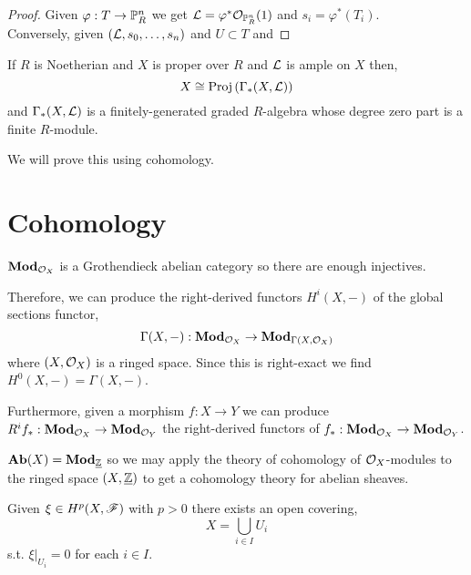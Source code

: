 \documentclass[12pt]{article}
\begin{document}
\begin{proof}
Given $\varphi : T \to \P^n_R$ we get $\L = \varphi^* \struct{\P^n_R}(1)$ and $s_i  = \varphi^*(T_i)$. 
\bigskip\\
Conversely, given $(\L, s_0, \dots, s_n)$ and $U \subset T$ and 
\end{proof}

\begin{theorem}
If $R$ is Noetherian and $X$ is proper over $R$ and $\L$ is ample on $X$ then, 
\[ X \cong \Proj{\Gamma_*(X, \L)} \]
and $\Gamma_*(X, \L)$ is a finitely-generated graded $R$-algebra whose degree zero part is a finite $R$-module. 
\end{theorem}

\begin{rmk}
We will prove this using cohomology. 
\end{rmk}

\section{Cohomology}

\begin{theorem}
$\Mod{\struct{X}}$ is a Grothendieck abelian category so there are enough injectives. 
\end{theorem}

\begin{definition}
Therefore, we can produce the right-derived functors $H^i(X, -)$ of the global sections functor,
\[ \Gamma(X, -) : \Mod{\struct{X}} \to \Mod{\Gamma(X, \struct{X})} \]
where $(X, \struct{X})$ is a ringed space. Since this is right-exact we find $H^0(X, -) = \Gamma(X, -)$. 
\end{definition}

\begin{definition}
Furthermore, given a morphism $f : X \to Y$ we can produce $R^i f_* : \Mod{\struct{X}} \to \Mod{\struct{Y}}$ the right-derived functors of $f_* : \Mod{\struct{X}} \to \Mod{\struct{Y}}$. 
\end{definition}

\begin{rmk}
$\Ab(X) = \Mod{\underline{\Z}}$ so we may apply the theory of cohomology of $\struct{X}$-modules to the ringed space $(X, \underline{\Z})$ to get a cohomology theory for abelian sheaves.
\end{rmk}

\begin{lemma}
Given $\xi \in H^p(X, \F)$ with $p > 0$ there exists an open covering,
\[ X = \bigcup_{i \in I} U_i \]
s.t. $\xi |_{U_i} = 0$ for each $i \in I$. 
\end{lemma}
\end{document}
